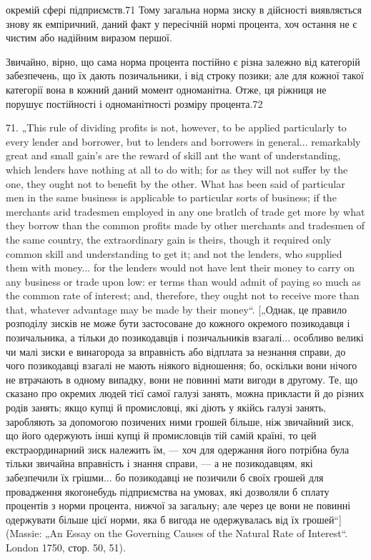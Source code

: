 окремій сфері підприємств.71 Тому загальна норма зиску в дійсності
виявляється знову як емпіричний, даний факт у пересічній
нормі процента, хоч остання не є чистим або надійним виразом
першої.

Звичайно, вірно, що сама норма процента постійно є різна
залежно від категорій забезпечень, що їх дають позичальники,
і від строку позики; але для кожної такої категорії вона
в кожний даний момент одноманітна. Отже, ця ріжниця не порушує
постійності і одноманітності розміру процента.72

71. „This rule of dividing profits is not, however, to be applied particularly to
every lender and borrower, but to lenders and borrowers in general... remarkably
great and small gain's are the reward of skill ant the want of understanding, which
lenders have nothing at all to do with; for as they will not suffer by the one,
they ought not to benefit by the other. What has been said of particular men in
the same business is applicable to particular sorts of business; if the merchants
arid tradesmen employed in any one bratlch of trade get more by what they borrow
than the common profits made by other merchants and tradesmen of the same
country, the extraordinary gain is theirs, though it required only common skill
and understanding to get it; and not the lenders, who supplied them with money...
for the lenders would not have lent their money to carry on any business or trade
upon low: er terms than would admit of paying so much as the common rate of
interest; and, therefore, they ought not to receive more than that, whatever advantage
may be made by their money“. [„Однак, це правило розподілу зисків не
може бути застосоване до кожного окремого позикодавця і позичальника, а
тільки до позикодавців і позичальників взагалі... особливо великі чи малі зиски
е винагорода за вправність або відплата за незнання справи, до чого позикодавці
взагалі не мають ніякого відношення; бо, оскільки вони нічого не втрачають
в одному випадку, вони не повинні мати вигоди в другому. Те, що сказано
про окремих людей тієї самої галузі занять, можна прикласти й до різних
родів занять; якщо купці й промисловці, які діють у якійсь галузі занять, заробляють
за допомогою позичених ними грошей більше, ніж звичайний зиск,
що його одержують інші купці й промисловців тій самій країні, то цей екстраординарний
зиск належить їм, — хоч для одержання його потрібна була тільки
звичайна вправність і знання справи, — а не позикодавцям, які забезпечили
їх грішми... бо позикодавці не позичили б своїх грошей для провадження якогонебудь
підприємства на умовах, які дозволяли б сплату процентів з норми
процента, нижчої за загальну; але через це вони не повинні одержувати більше
цієї норми, яка б вигода не одержувалась від їх грошей“] (Massie: „An
Essay on the Governing Causes of the Natural Rate of Interest“. London 1750,
стор. 50, 51).

